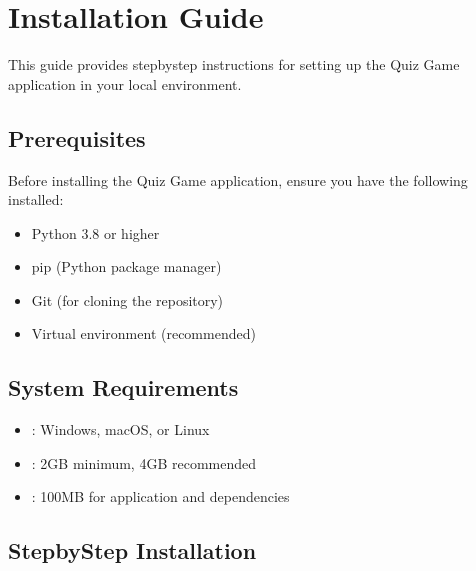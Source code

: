 \documentclass[letterpaper,10pt,english]{sphinxmanual}
\begin{document}
\sphinxstepscope


\section{Installation Guide}
\label{\detokenize{installation:installation-guide}}\label{\detokenize{installation::doc}}
\sphinxAtStartPar
This guide provides step\sphinxhyphen{}by\sphinxhyphen{}step instructions for setting up the Quiz Game application
in your local environment.


\subsection{Prerequisites}
\label{\detokenize{installation:prerequisites}}
\sphinxAtStartPar
Before installing the Quiz Game application, ensure you have the following installed:
\begin{itemize}
\item {} 
\sphinxAtStartPar
Python 3.8 or higher

\item {} 
\sphinxAtStartPar
pip (Python package manager)

\item {} 
\sphinxAtStartPar
Git (for cloning the repository)

\item {} 
\sphinxAtStartPar
Virtual environment (recommended)

\end{itemize}


\subsection{System Requirements}
\label{\detokenize{installation:system-requirements}}\begin{itemize}
\item {} 
\sphinxAtStartPar
{}: Windows, macOS, or Linux

\item {} 
\sphinxAtStartPar
{}: 2GB minimum, 4GB recommended

\item {} 
\sphinxAtStartPar
{}: 100MB for application and dependencies

\end{itemize}


\subsection{Step\sphinxhyphen{}by\sphinxhyphen{}Step Installation}
\label{\detokenize{installation:step-by-step-installation}}
\end{document}
